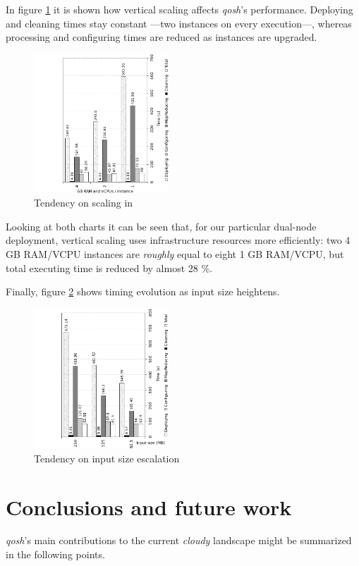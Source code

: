 \documentclass{sig-alternate}
\begin{document}
In figure \ref{fig:scalein} it is shown how vertical scaling affects \emph{qosh}'s performance. Deploying and cleaning times stay constant ---two instances on every execution---, whereas processing and configuring times are reduced as instances are upgraded.

\begin{figure}[htp]
\centering
\includegraphics[width=0.45\textwidth]{img/008}
\caption{Tendency on scaling in}
\label{fig:scalein}
\end{figure}

Looking at both charts it can be seen that, for our particular dual-node deployment, vertical scaling uses infrastructure resources more efficiently: two 4 GB RAM/VCPU instances are \emph{roughly} equal to eight 1 GB RAM/VCPU, but total executing time is reduced by almost 28 \%.

Finally, figure \ref{fig:inputscale} shows timing evolution as input size heightens.

\begin{figure}[htp]
\centering
\includegraphics[width=0.45\textwidth]{img/009}
\caption{Tendency on input size escalation}
\label{fig:inputscale}
\end{figure}



\section{Conclusions and future work}\label{sec:conclusions}
\noindent \emph{qosh}'s main contributions to the current \emph{cloudy} landscape might be summarized in the following points.
\end{document}
